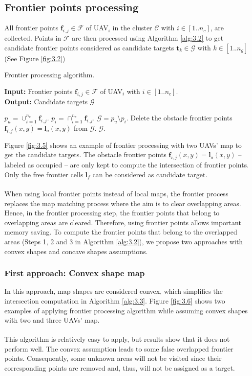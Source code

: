 \documentclass[11pt,openany]{book}
\begin{document}
\subsection{Frontier points processing}
All frontier points $\mathbf{f}_{i,j} \in \mathcal{F}$ of UAV$_i$ in the cluster $\mathcal{C}$ with $i \in [1..n_c]$, are collected. Points in $\mathcal{F}$ are then processed using Algorithm \ref{alg:3.2} to get candidate frontier points considered as candidate targets $\mathbf{t}_k \in \mathcal{G}$ with $k \in [1..n_g]$ (See Figure \ref{fig:3.2})
\begin{algorithm}[H]
    \caption{Frontier processing algorithm.}
    \label{alg:3.2}
    \hspace*{\algorithmicindent} \textbf{Input:} Frontier points $\mathbf{f}_{i,j} \in \mathcal{F}$ of UAV$_i$ with $i \in [1..n_c]$. \\
    \hspace*{\algorithmicindent} \textbf{Output:} Candidate targets $\mathcal{G}$
    \begin{algorithmic}[1]
        \STATE $p_u=\cup_{i=1}^{n_c}\mathbf{f}_{i,j}$.
        \STATE $p_i=\cap_{i=1}^{n_c}\mathbf{f}_{i,j}$.
        \STATE $\mathcal{G}=p_u\setminus p_i$.
        \STATE Delete the obstacle frontier points $\mathbf{f}_{i,j}(x,y)=\mathbf{l}_o(x,y)$ from $\mathcal{G}$.
        \RETURN $\mathcal{G}$.
    \end{algorithmic}
\end{algorithm}
Figure \ref{fig:3.5} shows an example of frontier processing with two UAVs’ map to get the candidate targets. The obstacle frontier points $\mathbf{f}_{i,j}(x,y)=\mathbf{l}_o(x,y)$ – labeled as occupied – are only kept to compute the intersection of frontier points. Only the free frontier cells $\mathbf{l}_f$ can be considered as candidate target.\\\\
When using local frontier points instead of local maps, the frontier process replaces the map matching process where the aim is to clear overlapping areas. Hence, in the frontier processing step, the frontier points that belong to overlapping areas are cleared. Therefore, using frontier points allows important memory saving. To compute the frontier points that belong to the overlapped areas (Steps 1, 2 and 3 in Algorithm \ref{alg:3.2}), we propose two approaches with convex shapes and concave shapes assumptions.
\subsubsection{First approach: Convex shape map}
In this approach, map shapes are considered convex, which simpliﬁes the intersection computation in Algorithm \ref{alg:3.3}. Figure \ref{fig:3.6} shows two examples of applying frontier processing algorithm while assuming convex shapes with two and three UAVs’ map.\\\\
This algorithm is relatively easy to apply, but results show that it does not perform well. The convex assumption leads to some false overlapped frontier points. Consequently, some unknown areas will not be visited since their corresponding points are removed and, thus, will not be assigned as a target.
\end{document}
